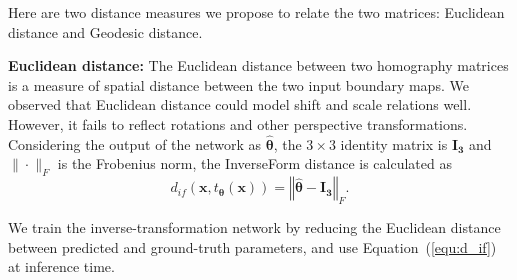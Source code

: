 \documentclass[final]{cvpr}
\begin{document}
Here are two distance measures we propose to relate the two matrices: Euclidean distance and Geodesic distance. 

\textbf{Euclidean distance:} The Euclidean distance between two homography matrices is a measure of spatial distance between the two input boundary maps. We observed that Euclidean distance could model shift and scale relations well. However, it fails to reflect rotations and other perspective transformations. Considering the output of the network as $\hat{\boldsymbol{\theta}}$, the $3\times 3$ identity matrix is $\boldsymbol{I_{3}}$ and $\|\cdot \|_F$ is the Frobenius norm, the InverseForm distance is calculated as
\begin{equation}\label{equ:d_if}
   d_{if}(\boldsymbol{x}, t_{\boldsymbol{\theta}}(\boldsymbol{x})) = \left\Vert \hat{\boldsymbol{\theta}} - \boldsymbol{I_{3}} \right\Vert_{F}. 
\end{equation}

We train the inverse-transformation network by reducing the Euclidean distance between predicted and ground-truth parameters, and use Equation~(\ref{equ:d_if}) at inference time.
\end{document}

